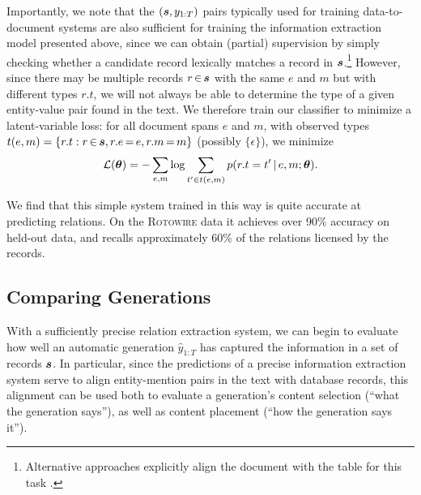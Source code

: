 \documentclass[11pt,letterpaper]{article}
\begin{document}
Importantly, we note that the $(\boldsymbol{s}, y_{1:T})$ pairs typically used for training data-to-document systems are also sufficient for training the information
extraction model presented above, since we can obtain (partial) supervision by simply checking whether
a candidate record lexically matches a record in $\boldsymbol{s}$.\footnote{Alternative approaches
  explicitly align the document with the table for this task \cite{liang2009learning}.} However, since there may be multiple records $r \, {\in} \, \boldsymbol{s}$ with the same $e$ and $m$ but with different types $r.t$, we will not always be able to determine the type of a given entity-value pair found in the text. We therefore train our classifier to
minimize a latent-variable loss: for all document spans $e$ and $m$, with observed types $t(e,m)= \{r.t : r \, {\in} \, \boldsymbol{s}, r.e \, {=} \, e, r.m \, {=} \, m\}$ (possibly $\{\epsilon\}$), we minimize
\begin{align*}
\mathcal{L}(\boldsymbol{\theta}) = - \sum_{e,m} \log \sum_{t'\in t(e,m)} p(r.t=t' \,|\, e,m ;\boldsymbol{\theta}).
\end{align*} 

\noindent We find that this simple system trained in this way is
quite accurate at predicting relations. On the \textsc{Rotowire}
data it achieves over 90\% accuracy on held-out data, and recalls approximately 60\% of the relations licensed by the records.

\subsection{Comparing Generations} 
\label{sec:comparing}
With a sufficiently precise relation extraction system, we can begin to evaluate how well an automatic generation $\hat{y}_{1:T}$ has captured the information in a set of records $\boldsymbol{s}$. In particular, since the predictions of a precise information extraction system serve to align entity-mention pairs in the text with database records, this alignment can be used both to evaluate a generation's content selection (``what the generation says''), as well as content placement (``how the generation says it'').
\end{document}

